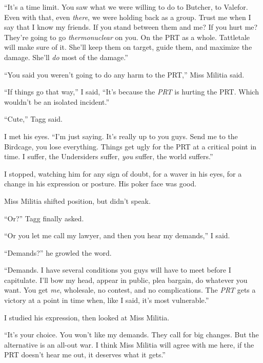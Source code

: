 ``It's a time limit.  You saw what we were willing to do to Butcher, to Valefor.  Even with that, even \emph{there}, we were holding back as a group.  Trust me when I say that I know my friends.  If you stand between them and me?  If you hurt me?  They're going to go \emph{thermonuclear} on you.  On the PRT as a whole.  Tattletale will make sure of it.  She'll keep them on target, guide them, and maximize the damage.  She'll \emph{do} most of the damage.''



``You said you weren't going to do any harm to the PRT,'' Miss Militia said.



``If things go that way,'' I said, ``It's because the \emph{PRT} is hurting the PRT.  Which wouldn't be an isolated incident.''



``Cute,'' Tagg said.



I met his eyes.  ``I'm just saying.  It's really up to you guys.  Send me to the Birdcage, you lose everything.  Things get ugly for the PRT at a critical point in time.  I suffer, the Undersiders suffer, \emph{you} suffer, the world suffers.''



I stopped, watching him for any sign of doubt, for a waver in his eyes, for a change in his expression or posture.  His poker face was good.



Miss Militia shifted position, but didn't speak.



``Or?'' Tagg finally asked.



``Or you let me call my lawyer, and then you hear my demands,'' I said.



``Demands?'' he growled the word.



``Demands.  I have several conditions you guys will have to meet before I capitulate.  I'll bow my head, appear in public, plea bargain, do whatever you want.  You get \emph{me}, wholesale, no contest, and no complications.  The \emph{PRT} gets a victory at a point in time when, like I said, it's most vulnerable.''



I studied his expression, then looked at Miss Militia.



``It's your choice.  You won't like my demands.  They call for big changes.  But the alternative is an all-out war.  I think Miss Militia will agree with me here, if the PRT doesn't hear me out, it deserves what it gets.''






